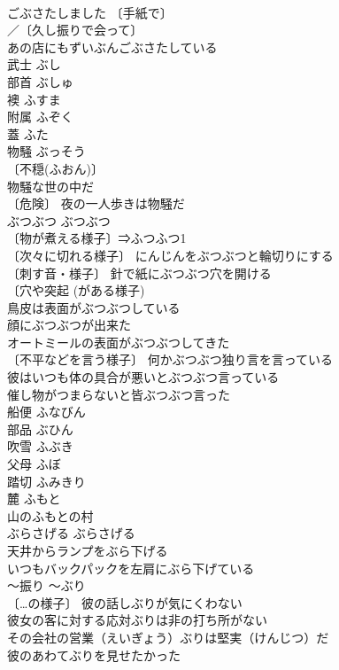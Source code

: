 \documentclass[8pt]{extreport}
\begin{document}
\begin{CJK}{UTF8}{min}
\\	ごぶさたしました 〔手紙で〕
\\	／〔久し振りで会って〕
\\	あの店にもずいぶんごぶさたしている 
\\	武士	ぶし	
\\	部首	ぶしゅ	
\\	襖	ふすま	
\\	附属	ふぞく	
\\	蓋	ふた	
\\	物騒	ぶっそう	
\\	〔不穏(ふおん)〕　
\\	物騒な世の中だ 
\\	〔危険〕 夜の一人歩きは物騒だ 
\\	ぶつぶつ	ぶつぶつ	
\\	〔物が煮える様子〕⇒ふつふつ1 
\\	〔次々に切れる様子〕 にんじんをぶつぶつと輪切りにする 
\\	〔刺す音・様子〕 針で紙にぶつぶつ穴を開ける 
\\	〔穴や突起 (がある様子) 
\\	鳥皮は表面がぶつぶつしている 
\\	顔にぶつぶつが出来た 
\\	オートミールの表面がぶつぶつしてきた 
\\	〔不平などを言う様子〕 何かぶつぶつ独り言を言っている 
\\	彼はいつも体の具合が悪いとぶつぶつ言っている 
\\	催し物がつまらないと皆ぶつぶつ言った 
\\	船便	ふなびん	
\\	部品	ぶひん	
\\	吹雪	ふぶき	
\\	父母	ふぼ	
\\	踏切	ふみきり	
\\	麓	ふもと	
\\	山のふもとの村 
\\	ぶらさげる	ぶらさげる	
\\	天井からランプをぶら下げる 
\\	いつもバックパックを左肩にぶら下げている 
\\	～振り	～ぶり	
\\	〔…の様子〕 彼の話しぶりが気にくわない 
\\	彼女の客に対する応対ぶりは非の打ち所がない 
\\	その会社の営業（えいぎょう）ぶりは堅実（けんじつ）だ 
\\	彼のあわてぶりを見せたかった 

\end{CJK}
\end{document}

